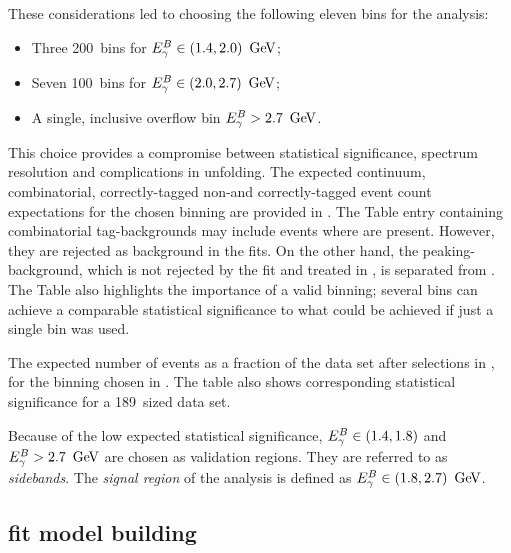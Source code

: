 These considerations led to choosing the following eleven \EB bins for the analysis:
\begin{itemize}
    \item Three 200~\mev bins for ${E^B_{\gamma}}\in(1.4,2.0)~\mathrm{\,Ge\kern -0.1em V}$;
    \item Seven 100~\mev bins for ${E^B_{\gamma}}\in(2.0,2.7)~\mathrm{\,Ge\kern -0.1em V}$;
    \item A single, inclusive overflow bin ${E^B_{\gamma}}>2.7~\mathrm{\,Ge\kern -0.1em V}$.
\end{itemize}
This choice provides a compromise between statistical significance, \EB spectrum resolution and complications in unfolding.
The expected continuum, combinatorial, correctly-tagged non-\BtoXsgamma and correctly-tagged \BtoXsgamma event count expectations for the chosen binning are provided in .
The Table entry containing combinatorial tag-\B backgrounds may include events where \BtoXsgamma are present.
However, they are rejected as background in the \Mbc fits.
On the other hand, the peaking-\BB background, which is not rejected by the \Mbc fit and treated in , is separated from \BtoXsgamma.
The Table also highlights the importance of a valid binning; several bins can achieve a comparable statistical significance to what could be achieved if just a single bin was used.

\begin{table}[htbp!]
    \caption{\label{tab:expected_events}
    The expected number of events as a fraction of the data set after selections in , for the binning chosen in .
    The table also shows corresponding statistical significance for a 189~\invfb sized data set.
    }
    
\end{table}

Because of the low expected statistical significance, ${E^B_{\gamma}}\in(1.4,1.8)$ and ${E^B_{\gamma}}>2.7~\mathrm{\,Ge\kern -0.1em V}$ are chosen as validation regions.
They are referred to as \textit{sidebands}.
The \textit{signal region} of the analysis is defined as ${E^B_{\gamma}}\in(1.8,2.7)~\mathrm{\,Ge\kern -0.1em V}$.

\subsection{\texorpdfstring{\Mbc}{Mbc} fit model building}\label{sec:fitting_setup}

